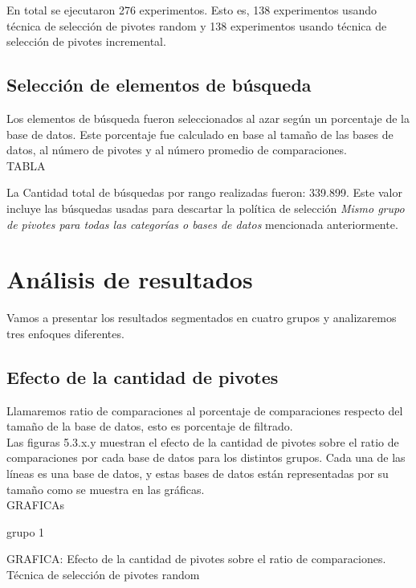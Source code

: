En total se ejecutaron 276 experimentos. Esto es, 138 experimentos usando t\'ecnica de selecci\'on de pivotes random y 138 experimentos usando t\'ecnica de selecci\'on de pivotes incremental.\\


\subsection{Selecci\'on de elementos de b\'usqueda}

Los elementos de b\'usqueda fueron seleccionados al azar seg\'un un porcentaje de la base de datos. Este porcentaje fue calculado en base al tamaño de las bases de datos, al n\'umero de pivotes y al n\'umero promedio de comparaciones.\\

TABLA

La Cantidad total de b\'usquedas por rango realizadas fueron: 339.899. Este valor incluye las b\'usquedas usadas para descartar la pol\'itica de selecci\'on \textit{Mismo grupo de pivotes para todas las categor\'ias o bases de datos} mencionada anteriormente.\\

\section{An\'alisis de resultados}

Vamos a presentar los resultados segmentados en cuatro grupos y analizaremos tres enfoques diferentes.\\

\subsection{Efecto de la cantidad de pivotes}

Llamaremos ratio de comparaciones al porcentaje de comparaciones respecto del tamaño de la base de datos, esto es porcentaje de filtrado.\\

Las figuras 5.3.x.y muestran el efecto de la cantidad de pivotes sobre el ratio de comparaciones por cada base de datos para los distintos grupos. Cada una de las l\'ineas es una base de datos, y estas bases de datos est\'an representadas por su tamaño como se muestra en las gr\'aficas.\\

GRAFICAs

grupo 1

GRAFICA: Efecto de la cantidad de pivotes sobre el ratio de comparaciones. T\'ecnica de selecci\'on de pivotes random


